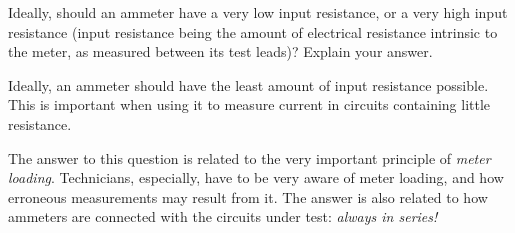 

Ideally, should an ammeter have a very low input resistance, or a very high input resistance (input resistance being the amount of electrical resistance intrinsic to the meter, as measured between its test leads)?  Explain your answer.







Ideally, an ammeter should have the least amount of input resistance possible.  This is important when using it to measure current in circuits containing little resistance.







The answer to this question is related to the very important principle of {\it meter loading}.  Technicians, especially, have to be very aware of meter loading, and how erroneous measurements may result from it.  The answer is also related to how ammeters are connected with the circuits under test: {\it always in series!}



